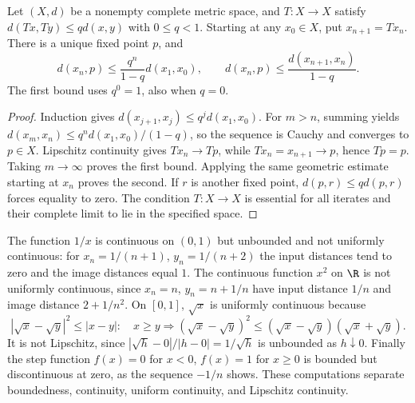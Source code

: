 \begin{theorem}
Let $(X,d)$ be a nonempty complete metric space, and $T:X\to X$ satisfy $d(Tx,Ty)\le qd(x,y)$ with $0\le q<1$. Starting at any $x_0\in X$, put $x_{n+1}=Tx_n$. There is a unique fixed point $p$, and
\[ d(x_n,p)\le \frac{q^n}{1-q}d(x_1,x_0),\qquad d(x_n,p)\le\frac{d(x_{n+1},x_n)}{1-q}. \]
The first bound uses $q^0=1$, also when $q=0$.
\end{theorem}
\begin{proof}
Induction gives $d(x_{j+1},x_j)\le q^jd(x_1,x_0)$. For $m>n$, summing yields $d(x_m,x_n)\le q^n d(x_1,x_0)/(1-q)$, so the sequence is Cauchy and converges to $p\in X$. Lipschitz continuity gives $Tx_n\to Tp$, while $Tx_n=x_{n+1}\to p$, hence $Tp=p$. Taking $m\to\infty$ proves the first bound. Applying the same geometric estimate starting at $x_n$ proves the second. If $r$ is another fixed point, $d(p,r)\le qd(p,r)$ forces equality to zero. The condition $T:X\to X$ is essential for all iterates and their complete limit to lie in the specified space.
\end{proof}

\begin{example}
The function $1/x$ is continuous on $(0,1)$ but unbounded and not uniformly continuous: for $x_n=1/(n+1)$, $y_n=1/(n+2)$ the input distances tend to zero and the image distances equal $1$. The continuous function $x^2$ on $\R$ is not uniformly continuous, since $x_n=n$, $y_n=n+1/n$ have input distance $1/n$ and image distance $2+1/n^2$. On $[0,1]$, $\sqrt{x}$ is uniformly continuous because
\[ |\sqrt x-\sqrt y|^2\le |x-y|: \quad x\ge y\Longrightarrow (\sqrt x-\sqrt y)^2\le(\sqrt x-\sqrt y)(\sqrt x+\sqrt y). \]
It is not Lipschitz, since $|\sqrt h-0|/|h-0|=1/\sqrt h$ is unbounded as $h\downarrow0$. Finally the step function $f(x)=0$ for $x<0$, $f(x)=1$ for $x\ge0$ is bounded but discontinuous at zero, as the sequence $-1/n$ shows. These computations separate boundedness, continuity, uniform continuity, and Lipschitz continuity.
\end{example}
